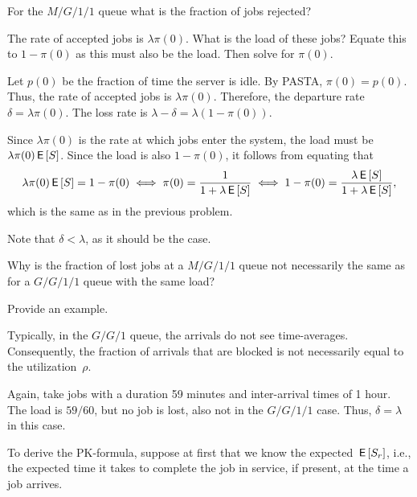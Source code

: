 \begin{extra}
 For the $M/G/1/1$ queue what is the fraction of jobs rejected?
\begin{hint}
 The rate of accepted jobs is $\lambda \pi(0)$.
 What is the load of these jobs?
 Equate this to $1-\pi(0)$ as this must also be the load.
 Then solve for $\pi(0)$.
\end{hint}
\begin{solution}
 Let $p(0)$ be the fraction of time the server is idle. By PASTA,
 $\pi(0)=p(0)$. Thus, the rate of accepted jobs is
 $\lambda\pi(0)$. Therefore, the departure rate
 $\delta=\lambda\pi(0)$. The loss rate is
 $\lambda-\delta = \lambda (1-\pi(0))$.

 Since $\lambda\pi(0)$ is the rate at which jobs enter the system,
 the load must be $\lambda\pi(0)\,\mathsf{E}\left[S\right]$. Since the load is also
 $1-\pi(0)$, it follows from equating that
 \begin{equation*}
 \lambda\pi(0) \,\mathsf{E}\left[S\right] = 1 - \pi(0) \iff \pi(0)=\frac1{1+\lambda\,\mathsf{E}\left[S\right]} 
\iff 1-\pi(0) = \frac{\lambda \,\mathsf{E}\left[S\right]}{1+\lambda \,\mathsf{E}\left[S\right]},
 \end{equation*}
which is the same as in the previous problem.

Note that $\delta < \lambda$, as it should be the case. 
\end{solution}
\end{extra}


\begin{extra}
 Why is the fraction of lost jobs at a $M/G/1/1$ queue not necessarily the same as for a $G/G/1/1$ queue with the same load?
\begin{hint}
Provide an example.
\end{hint}
\begin{solution}
 Typically, in the $G/G/1$ queue, the arrivals do not see time-averages. Consequently, the fraction of arrivals that are blocked is not necessarily equal to the utilization~$\rho$.

 Again, take jobs with a duration 59 minutes and inter-arrival times of
 1 hour. The load is $59/60$, but no job is lost, also not in the
 $G/G/1/1$ case. Thus, $\delta=\lambda$ in this case.
\end{solution}
\end{extra}



To derive the PK-formula, suppose at first that we know the expected  $\,\mathsf{E}\left[S_r\right]$, i.e., the expected time it takes to complete the job in service, if present, at the time a job arrives.




